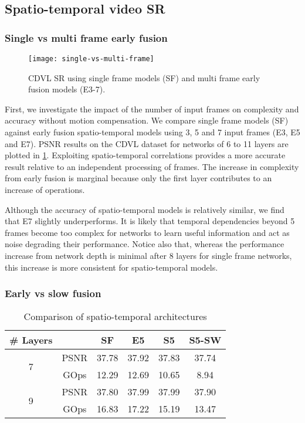 \documentclass[10pt,twocolumn,letterpaper]{article}
\begin{document}
\subsection{Spatio-temporal video SR}

\subsubsection{Single vs multi frame early fusion}

\begin{figure}[t]
  \centering
    \texttt{[image: single-vs-multi-frame]}
  \caption{CDVL  \gls{SR} using single frame models (SF) and multi frame early fusion models (E3-7).}
  \label{fig:single-vs-multi-frame}
\end{figure}

First, we investigate the impact of the number of input frames on complexity and accuracy without motion compensation. We compare single frame models (SF) against early fusion spatio-temporal models using 3, 5 and 7 input frames (E3, E5 and E7). \Gls{PSNR} results on the CDVL dataset for networks of 6 to 11 layers are plotted in \cref{fig:single-vs-multi-frame}. Exploiting spatio-temporal correlations provides a more accurate result relative to an independent processing of frames. The increase in complexity from early fusion is marginal because only the first layer contributes to an increase of operations.

Although the accuracy of spatio-temporal models is relatively similar, we find that E7 slightly underperforms. It is likely that temporal dependencies beyond 5 frames become too complex for networks to learn useful information and act as noise degrading their performance. Notice also that, whereas the performance increase from network depth is minimal after 8 layers for single frame networks, this increase is more consistent for spatio-temporal models.

\subsubsection{Early vs slow fusion}

\begin{table}[tb]
\centering
\footnotesize
\begin{tabular}{c|c|cccc}
\# Layers & & SF & E5      & S5      & S5-SW       \\ \hline
\multirow{2}{*}{7}   & PSNR & 37.78 & 37.92 & 37.83 & 37.74  \\
								& GOps & 12.29 & 12.69 & 10.65 & 8.94  \\ \hline
\multirow{2}{*}{9}   & PSNR & 37.80 & 37.99 & 37.99 &  37.90   \\
     							& GOps & 16.83 & 17.22 & 15.19 & 13.47
\end{tabular}
\caption{Comparison of spatio-temporal architectures}
\label{tab:early-vs-slow-fusion}
\end{table}
\end{document}
